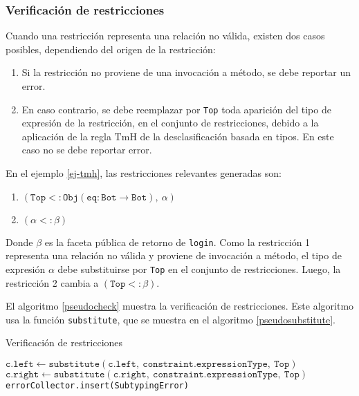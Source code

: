 \subsubsection{Verificación de restricciones} \label{propuestaVer}
Cuando una restricción representa una relación no válida, existen dos casos posibles, dependiendo del origen de la restricción:

\begin{enumerate}
  \item Si la restricción no proviene de una invocación a método, se debe reportar un error.
  \item En caso contrario, se debe reemplazar por \texttt{Top} toda aparición del tipo de expresión de la restricción, en el conjunto de restricciones, debido a la aplicación de la regla $\text{TmH}$ de la desclasificación basada en tipos. En este caso no se debe reportar error.
\end{enumerate}

En el ejemplo \ref{ej-tmh}, las restricciones relevantes generadas son:

\begin{enumerate}
  \item $(\mathtt{Top <: Obj(eq: Bot \rightarrow Bot),\ \alpha})$
  \item $(\mathtt{\alpha <: \beta})$
\end{enumerate}

Donde $\beta$ es la faceta pública de retorno de \texttt{login}. Como la restricción 1 representa una relación no válida y proviene de invocación a método, el tipo de expresión $\alpha$ debe substituirse por \texttt{Top} en el conjunto de restricciones. Luego, la restricción 2 cambia a $(\mathtt{Top <: \beta})$.

El algoritmo \ref{pseudocheck} muestra la verificación de restricciones. Este algoritmo usa la función \texttt{substitute}, que se muestra en el algoritmo \ref{pseudosubstitute}.
\clearpage
\begin{algorithm}\captionsetup{labelsep=newline}
  \centering
  \caption{Verificación de restricciones}
  \label{pseudocheck}
    \begin{algorithmic}[1]
                \State $\mathtt{c.left\gets substitute(c.left,\ constraint.expressionType,\ Top)}$
                \State $\mathtt{c.right\gets substitute(c.right,\ constraint.expressionType,\ Top)}$
              \EndFor
              \State \texttt{errorCollector.insert(SubtypingError)}
            \EndIf
          \EndFor
      \EndFunction
    \end{algorithmic}
\end{algorithm}

